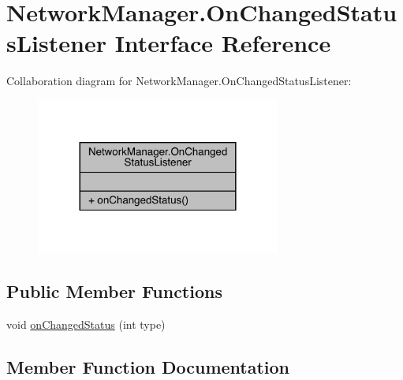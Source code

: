 \hypertarget{interfacecom_1_1toast_1_1android_1_1gamebase_1_1base_1_1_network_manager_1_1_on_changed_status_listener}{}\section{Network\+Manager.\+On\+Changed\+Status\+Listener Interface Reference}
\label{interfacecom_1_1toast_1_1android_1_1gamebase_1_1base_1_1_network_manager_1_1_on_changed_status_listener}


Collaboration diagram for Network\+Manager.\+On\+Changed\+Status\+Listener\+:
\nopagebreak
\begin{figure}[H]
\begin{center}
\leavevmode
\includegraphics[width=228pt]{interfacecom_1_1toast_1_1android_1_1gamebase_1_1base_1_1_network_manager_1_1_on_changed_status_listener__coll__graph}
\end{center}
\end{figure}
\subsection*{Public Member Functions}
\begin{DoxyCompactItemize}
\item 
void \hyperlink{interfacecom_1_1toast_1_1android_1_1gamebase_1_1base_1_1_network_manager_1_1_on_changed_status_listener_a9957c950680176bee859390555ba2301}{on\+Changed\+Status} (int type)
\end{DoxyCompactItemize}


\subsection{Member Function Documentation}
\mbox{\label{interfacecom_1_1toast_1_1android_1_1gamebase_1_1base_1_1_network_manager_1_1_on_changed_status_listener_a9957c950680176bee859390555ba2301}} 
